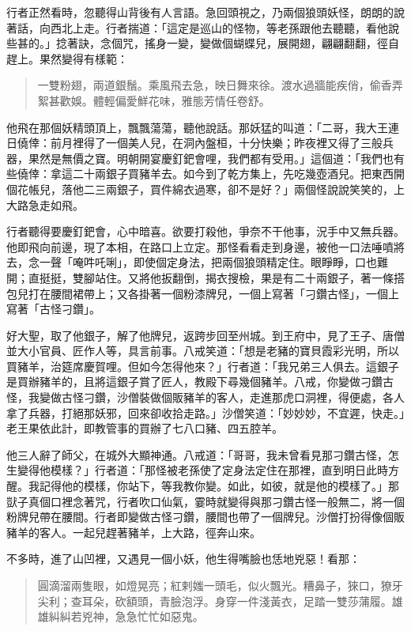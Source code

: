 行者正然看時，忽聽得山背後有人言語。急回頭視之，乃兩個狼頭妖怪，朗朗的說著話，向西北上走。行者揣道：「這定是巡山的怪物，等老孫跟他去聽聽，看他說些甚的。」捻著訣，念個咒，搖身一變，變做個蝴蝶兒，展開翅，翩翩翻翻，徑自趕上。果然變得有樣範：
\begin{quote}
一雙粉翅，兩道銀鬚。乘風飛去急，映日舞來徐。渡水過牆能疾俏，偷香弄絮甚歡娛。體輕偏愛鮮花味，雅態芳情任卷舒。
\end{quote}

他飛在那個妖精頭頂上，飄飄蕩蕩，聽他說話。那妖猛的叫道：「二哥，我大王連日僥倖：前月裡得了一個美人兒，在洞內盤桓，十分快樂；昨夜裡又得了三般兵器，果然是無價之寶。明朝開宴慶釘鈀會哩，我們都有受用。」這個道：「我們也有些僥倖：拿這二十兩銀子買豬羊去。如今到了乾方集上，先吃幾壺酒兒。把東西開個花帳兒，落他二三兩銀子，買件綿衣過寒，卻不是好？」兩個怪說說笑笑的，上大路急走如飛。

行者聽得要慶釘鈀會，心中暗喜。欲要打殺他，爭奈不干他事，況手中又無兵器。他即飛向前邊，現了本相，在路口上立定。那怪看看走到身邊，被他一口法唾噴將去，念一聲「唵吽吒唎」，即使個定身法，把兩個狼頭精定住。眼睜睜，口也難開；直挺挺，雙腳站住。又將他扳翻倒，揭衣搜檢，果是有二十兩銀子，著一條搭包兒打在腰間裙帶上；又各掛著一個粉漆牌兒，一個上寫著「刁鑽古怪」，一個上寫著「古怪刁鑽」。

好大聖，取了他銀子，解了他牌兒，返跨步回至州城。到王府中，見了王子、唐僧並大小官員、匠作人等，具言前事。八戒笑道：「想是老豬的寶貝霞彩光明，所以買豬羊，治筵席慶賀哩。但如今怎得他來？」行者道：「我兄弟三人俱去。這銀子是買辦豬羊的，且將這銀子賞了匠人，教殿下尋幾個豬羊。八戒，你變做刁鑽古怪，我變做古怪刁鑽，沙僧裝做個販豬羊的客人，走進那虎口洞裡，得便處，各人拿了兵器，打絕那妖邪，回來卻收拾走路。」沙僧笑道：「妙妙妙，不宜遲，快走。」老王果依此計，即教管事的買辦了七八口豬、四五腔羊。

他三人辭了師父，在城外大顯神通。八戒道：「哥哥，我未曾看見那刁鑽古怪，怎生變得他模樣？」行者道：「那怪被老孫使了定身法定住在那裡，直到明日此時方醒。我記得他的模樣，你站下，等我教你變。如此，如彼，就是他的模樣了。」那獃子真個口裡念著咒，行者吹口仙氣，霎時就變得與那刁鑽古怪一般無二，將一個粉牌兒帶在腰間。行者即變做古怪刁鑽，腰間也帶了一個牌兒。沙僧打扮得像個販豬羊的客人。一起兒趕著豬羊，上大路，徑奔山來。

不多時，進了山凹裡，又遇見一個小妖，他生得嘴臉也恁地兇惡！看那：
\begin{quote}
圓滴溜兩隻眼，如燈晃亮；紅剌媸一頭毛，似火飄光。糟鼻子，猍口，獠牙尖利；查耳朵，砍額頭，青臉泡浮。身穿一件淺黃衣，足踏一雙莎蒲履。雄雄糾糾若兇神，急急忙忙如惡鬼。
\end{quote}

